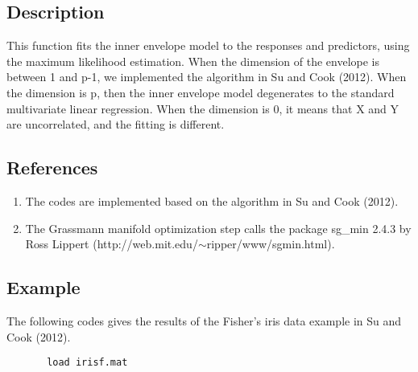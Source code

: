 \documentclass[a4paper,11pt,openany]{memoir}
\begin{document}
\subsection*{Description}

\begin{par}
This function fits the inner envelope model to the responses and predictors, using the maximum likelihood estimation.  When the dimension of the envelope is between 1 and p-1, we implemented the algorithm in Su and Cook (2012).  When the dimension is p, then the inner envelope model degenerates to the standard multivariate linear regression.  When the dimension is 0, it means that X and Y are uncorrelated, and the fitting is different.
\end{par} \vspace{1em}


\subsection*{References}

\begin{enumerate}
\setlength{\itemsep}{-1ex}
   \item The codes are implemented based on the algorithm in Su and Cook (2012).
   \item The Grassmann manifold optimization step calls the package sg\_min 2.4.3 by Ross Lippert (http://web.mit.edu/$\sim$ripper/www/sgmin.html).
\end{enumerate}


\subsection*{Example}

\begin{par}
The following codes gives the results of the Fisher's iris data example in Su and Cook (2012).
\end{par} \vspace{1em}

\begin{verbatim}       load irisf.mat\end{verbatim}
    
\end{document}
